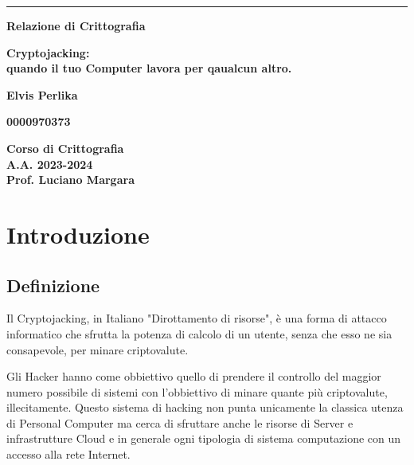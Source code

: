 \documentclass[12pt,a4paper]{article}
\begin{document}
\begin{titlepage}
\begin{center}
\rule[0.5cm]{15.8cm}{0.6mm}
{\small{\bf Relazione di Crittografia }}
\end{center}
\vspace{15mm}
\begin{center}
{\LARGE{\bf Cryptojacking:} \\ 
\vspace{3mm}
{\bf quando il tuo Computer lavora per qaualcun altro.}}
\end{center}
\vspace{35mm}
\par
\noindent
\begin{center}
{\large{\bf Elvis Perlika}}
\end{center}
\begin{center}
{\large{\bf 0000970373}}
\end{center}
\hfill

\vspace{70mm}
\begin{center}
{\large{\bf Corso di Crittografia \\ 
A.A. 2023-2024 \\
Prof. Luciano Margara}}
\end{center}
\end{titlepage}

\newpage

\tableofcontents

\newpage

\section{Introduzione}
\subsection{Definizione}

Il Cryptojacking, in Italiano "Dirottamento di risorse", è una forma di attacco
informatico che sfrutta la potenza di calcolo di un utente, senza che esso ne
sia consapevole, per minare criptovalute. \cite{CSO}

Gli Hacker hanno come obbiettivo quello di prendere il controllo del maggior
numero possibile di sistemi con l'obbiettivo di minare quante più criptovalute,
illecitamente. Questo sistema di hacking non punta unicamente la classica utenza
di Personal Computer ma cerca di sfruttare anche le risorse di Server e
infrastrutture Cloud e in generale ogni tipologia di sistema computazione con un
accesso alla rete Internet.
\end{document}
